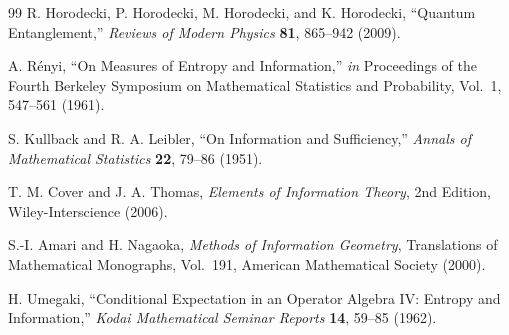 \documentclass[12pt,a4paper,oneside]{book}
\theoremstyle{plain}
\theoremstyle{definition}
\theoremstyle{remark}
\begin{document}
\begin{thebibliography}{99}
R. Horodecki, P. Horodecki, M. Horodecki, and K. Horodecki,
``Quantum Entanglement,''
\emph{Reviews of Modern Physics} \textbf{81}, 865--942 (2009).

A. R\'enyi,
``On Measures of Entropy and Information,''
\emph{in} Proceedings of the Fourth Berkeley Symposium on Mathematical Statistics and Probability, Vol.~1, 547--561 (1961).

S. Kullback and R. A. Leibler,
``On Information and Sufficiency,''
\emph{Annals of Mathematical Statistics} \textbf{22}, 79--86 (1951).

T. M. Cover and J. A. Thomas,
\emph{Elements of Information Theory},
2nd Edition, Wiley-Interscience (2006).

S.-I. Amari and H. Nagaoka,
\emph{Methods of Information Geometry},
Translations of Mathematical Monographs, Vol.~191, American Mathematical Society (2000).

H. Umegaki,
``Conditional Expectation in an Operator Algebra IV: Entropy and Information,''
\emph{Kodai Mathematical Seminar Reports} \textbf{14}, 59--85 (1962).

\end{thebibliography}
\end{document}
